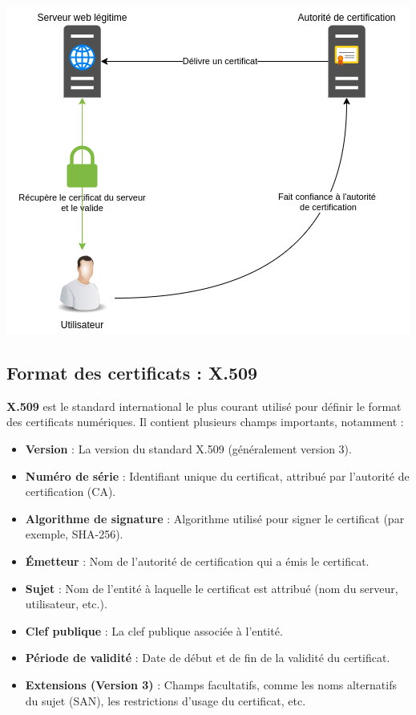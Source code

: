 \documentclass[french, 12pt]{article}%
\newcommand{\itemE}{\item[$\bullet$]}
\begin{document}
\begin{center}
\includegraphics[scale=0.7]{./ressource/certifcatUtilisation}
\end{center}



\subsection{Format des certificats : X.509}

\textbf{X.509} est le standard international le plus courant utilisé pour définir le format des certificats numériques. Il contient plusieurs champs importants, notamment :
\begin{itemize}
\itemE \textbf{Version} : La version du standard X.509 (généralement version 3).
\itemE \textbf{Numéro de série} : Identifiant unique du certificat, attribué par l'autorité de certification (CA).
\itemE \textbf{Algorithme de signature} : Algorithme utilisé pour signer le certificat (par exemple, SHA-256).
\itemE \textbf{Émetteur} : Nom de l'autorité de certification qui a émis le certificat.
\itemE \textbf{Sujet} : Nom de l'entité à laquelle le certificat est attribué (nom du serveur, utilisateur, etc.).
\itemE \textbf{Clef publique} : La clef publique associée à l'entité.
\itemE \textbf{Période de validité} : Date de début et de fin de la validité du certificat.
\itemE \textbf{Extensions (Version 3)} : Champs facultatifs, comme les noms alternatifs du sujet (SAN), les restrictions d'usage du certificat, etc.

\end{itemize}
\end{document}
